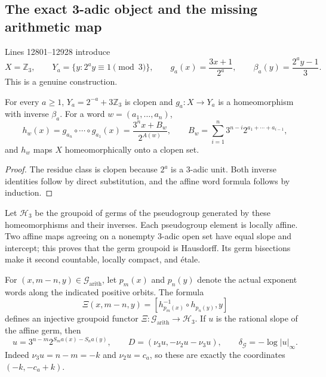 \subsection{The exact 3-adic object and the missing arithmetic map}

Lines 12801--12928 introduce
\begin{equation}
\label{eq:critical-three-adic-branches}
 X=\mathbb Z_3,\qquad
 Y_a=\{y:2^ay\equiv1\pmod3\},\qquad
 g_a(x)=\frac{3x+1}{2^a},\qquad
 \beta_a(y)=\frac{2^ay-1}{3}.
\end{equation}
This is a genuine construction.

\begin{proposition}
\label{prop:critical-three-adic-homeomorphisms}
For every $a\geq1$, $Y_a=2^{-a}+3\mathbb Z_3$ is clopen and
$g_a:X\to Y_a$ is a homeomorphism with inverse $\beta_a$.  For a word
$w=(a_1,\ldots,a_n)$,
\[
 h_w(x)=g_{a_n}\circ\cdots\circ g_{a_1}(x)
 =\frac{3^nx+B_w}{2^{A(w)}},
 \qquad
 B_w=\sum_{i=1}^n3^{n-i}2^{a_1+\cdots+a_{i-1}},
\]
and $h_w$ maps $X$ homeomorphically onto a clopen set.
\end{proposition}

\begin{proof}
The residue class is clopen because $2^a$ is a $3$-adic unit.  Both inverse
identities follow by direct substitution, and the affine word formula follows
by induction.
\end{proof}

Let $\mathcal H_3$ be the groupoid of germs of the pseudogroup generated by
these homeomorphisms and their inverses.  Each pseudogroup element is locally
affine.  Two affine maps agreeing on a nonempty $3$-adic open set have equal
slope and intercept; this proves that the germ groupoid is Hausdorff.  Its
germ bisections make it second countable, locally compact, and \'{e}tale.

\begin{theorem}
\label{thm:critical-arithmetic-germ-functor}
For $(x,m-n,y)\in\mathcal G_{\mathrm{arith}}$, let $p_m(x)$ and $p_n(y)$
denote the actual exponent words along the indicated positive orbits.  The
formula
\begin{equation}
\label{eq:critical-arithmetic-germ-map}
 \Xi(x,m-n,y)=
 [h_{p_m(x)}^{-1}\circ h_{p_n(y)},y]
\end{equation}
defines an injective groupoid functor
$\Xi:\mathcal G_{\mathrm{arith}}\to\mathcal H_3$.
If $u$ is the rational slope of the affine germ, then
\[
 u=3^{n-m}2^{S_ma(x)-S_na(y)},\qquad
 D=(\nu_3u,-\nu_2u-\nu_3u),\qquad
 \delta_{\mathcal G}=-\log|u|_\infty.
\]
Indeed $\nu_3u=n-m=-k$ and $\nu_2u=c_a$, so these are exactly
the coordinates $(-k,-c_a+k)$.
\end{theorem}

